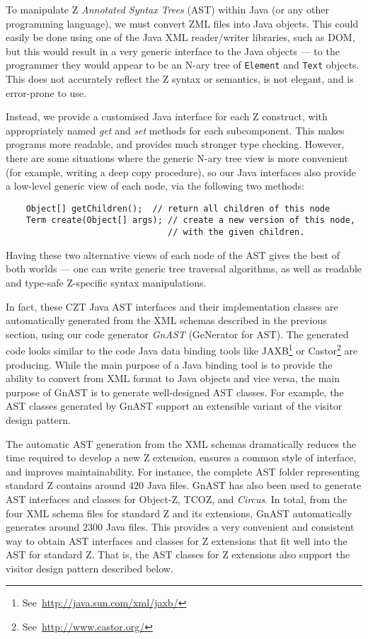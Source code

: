 \documentclass{llncs}
\newcommand{\Circus}{{\sf\slshape Circus}}
\begin{document}
  To manipulate Z \emph{Annotated Syntax Trees} (AST) within Java (or
  any other programming language), we must convert ZML files into Java
  objects.  This could easily be done using one of the Java XML
  reader/writer libraries, such as DOM, but this would result in a
  very generic interface to the Java objects --- to the programmer they
  would appear to be an N-ary tree of \texttt{Element} and
  \texttt{Text} objects. This does not accurately reflect the Z
  syntax or semantics, is not elegant, and is error-prone to use.

  Instead, we provide a customised Java interface for each Z
  construct, with appropriately named \emph{get} and \emph{set}
  methods for each subcomponent.  This makes programs more readable,
  and provides much stronger type checking.  However, there are some
  situations where the generic N-ary tree view is more convenient
  (for example, writing a deep copy procedure), so our Java interfaces
  also provide a low-level generic view of each node, via the following
  two methods:
\begin{small}
\begin{verbatim}
    Object[] getChildren();  // return all children of this node
    Term create(Object[] args); // create a new version of this node,
                                // with the given children.
\end{verbatim}
\end{small}
  Having these two alternative views of each node of the AST gives
  the best of both worlds --- one can write generic tree traversal
  algorithms, as well as readable and type-safe Z-specific syntax
  manipulations.

  In fact, these CZT Java AST interfaces and their implementation
  classes are automatically generated from the XML schemas described
  in the previous section, using our code generator \emph{GnAST}
  (GeNerator for AST).  The generated code looks similar to the code
  Java data binding tools like
  JAXB\footnote{See~\url{http://java.sun.com/xml/jaxb/}} or
  Castor\footnote{See~\url{http://www.castor.org/}} are
  producing. While the main purpose of a Java binding tool is to
  provide the ability to convert from XML format to Java objects and
  vice versa, the main purpose of GnAST is to generate well-designed
  AST classes.  For example, the AST classes generated by GnAST
  support an extensible variant of the visitor design pattern.

  The automatic AST generation from the XML schemas dramatically
  reduces the time required to develop a new Z extension, ensures a
  common style of interface, and improves maintainability.  For
  instance, the complete AST folder representing standard Z contains
  around $420$ Java files.  GnAST has also been used to generate AST
  interfaces and classes for Object-Z, TCOZ, and \Circus.  In total,
  from the four XML schema files for standard Z and its extensions,
  GnAST automatically generates around $2300$ Java files.  This
  provides a very convenient and consistent way to obtain AST interfaces
  and classes for Z extensions that fit well into the AST for standard Z.
  That is, the AST classes for Z extensions also support the visitor design
  pattern described below.
\end{document}
